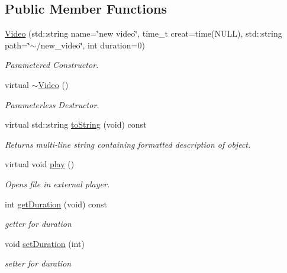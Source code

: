 \subsection*{Public Member Functions}
\begin{DoxyCompactItemize}
\item 
\hypertarget{classVideo_ad0277d8e5772008e22ac2948e03e103b}{\hyperlink{classVideo_ad0277d8e5772008e22ac2948e03e103b}{Video} (std\-::string name=\char`\"{}new video\char`\"{}, time\-\_\-t creat=time(N\-U\-L\-L), std\-::string path=\char`\"{}$\sim$/new\-\_\-video\char`\"{}, int duration=0)}\label{classVideo_ad0277d8e5772008e22ac2948e03e103b}

\begin{DoxyCompactList}\small\item\em Parametered Constructor. \end{DoxyCompactList}\item 
virtual \hyperlink{classVideo_aebf7e2a8fa2bbd79335b1cf35925d190}{$\sim$\-Video} ()
\begin{DoxyCompactList}\small\item\em Parameterless Destructor. \end{DoxyCompactList}\item 
\hypertarget{classVideo_af09cd9142969d63b514a251769fbed86}{virtual std\-::string \hyperlink{classVideo_af09cd9142969d63b514a251769fbed86}{to\-String} (void) const }\label{classVideo_af09cd9142969d63b514a251769fbed86}

\begin{DoxyCompactList}\small\item\em Returns multi-\/line string containing formatted description of object. \end{DoxyCompactList}\item 
\hypertarget{classVideo_a192acb2bbb1592566ec2393dc99e3083}{virtual void \hyperlink{classVideo_a192acb2bbb1592566ec2393dc99e3083}{play} ()}\label{classVideo_a192acb2bbb1592566ec2393dc99e3083}

\begin{DoxyCompactList}\small\item\em Opens file in external player. \end{DoxyCompactList}\item 
\hypertarget{classVideo_a1a495dbb8b0389e092758c62144ebc45}{int \hyperlink{classVideo_a1a495dbb8b0389e092758c62144ebc45}{get\-Duration} (void) const }\label{classVideo_a1a495dbb8b0389e092758c62144ebc45}

\begin{DoxyCompactList}\small\item\em getter for duration \end{DoxyCompactList}\item 
\hypertarget{classVideo_a0fbbf03b902423efa2179142902bb0d0}{void \hyperlink{classVideo_a0fbbf03b902423efa2179142902bb0d0}{set\-Duration} (int)}\label{classVideo_a0fbbf03b902423efa2179142902bb0d0}

\begin{DoxyCompactList}\small\item\em setter for duration \end{DoxyCompactList}\end{DoxyCompactItemize}



